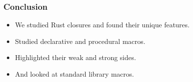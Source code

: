 \documentclass[aspectratio=1610,t]{beamer}
\begin{document}

\begin{frame}[fragile]
\frametitle{Conclusion}
\begin{itemize}
    \item We studied Rust closures and found their unique features.
    \item Studied declarative and procedural macros.
    \item Highlighted their weak and strong sides.
    \item And looked at standard library macros.
\end{itemize}
\end{frame}

\end{document}
